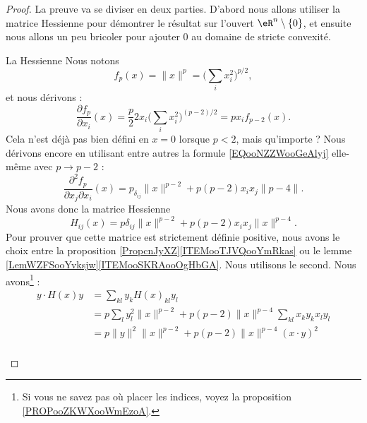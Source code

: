\begin{proof}
    La preuve va se diviser en deux parties. D'abord nous allons utiliser la matrice Hessienne pour démontrer le résultat sur l'ouvert \( \eR^n\setminus\{ 0 \}\), et ensuite nous allons un peu bricoler pour ajouter \( 0\) au domaine de stricte convexité.

    \begin{subproof}
    \item[La Hessienne]
        Nous notons
        \begin{equation}
            f_p(x)=\| x \|^p=\big( \sum_ix_i^2 \big)^{p/2},
        \end{equation}
        et nous dérivons :
        \begin{equation}        \label{EQooNZZWooGeAlyj}
            \frac{ \partial f_p }{ \partial x_i }(x)=\frac{ p }{2}2x_i\big( \sum_ix_i^2 \big)^{(p-2)/2}=px_if_{p-2}(x).
        \end{equation}
        Cela n'est déjà pas bien défini en \( x=0\) lorsque \( p<2\), mais qu'importe ? Nous dérivons encore en utilisant entre autres la formule \eqref{EQooNZZWooGeAlyj} elle-même avec \( p\to p-2\) :
        \begin{equation}
            \frac{ \partial^2f_p  }{ \partial x_j\partial x_i }(x)=p_{\delta_{ij}}\| x \|^{p-2}+p(p-2)x_ix_j\| p-4 \|.
        \end{equation}
        Nous avons donc la matrice Hessienne
        \begin{equation}
            H_{ij}(x)=p\delta_{ij}\| x \|^{p-2}+p(p-2)x_ix_j\| x \|^{p-4}.
        \end{equation}
        Pour prouver que cette matrice est strictement définie positive, nous avons le choix entre la proposition \ref{PropcnJyXZ}\ref{ITEMooTJVQooYmRkas} ou le lemme \ref{LemWZFSooYvksjw}\ref{ITEMooSKRAooOgHbGA}. Nous utilisons le second. Nous avons\footnote{Si vous ne savez pas où placer les indices, voyez la proposition \ref{PROPooZKWXooWmEzoA}.} :
        \begin{subequations}
            \begin{align}
                y\cdot H(x)y  & = \sum_{kl}y_kH(x)_{kl}y_l                                          \\
                              & = p\sum_ly_l^2\| x \|^{p-2}+p(p-2)\| x \|^{p-4}\sum_{kl}x_ky_kx_ly_l\\
                              & = p\| y \|^2\| x \|^{p-2}+p(p-2)\| x \|^{p-4}(x\cdot y)^2           \\

\end{align}
\end{subequations}
\end{subproof}
\end{proof}
